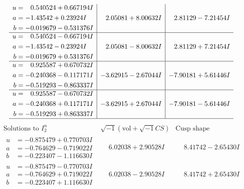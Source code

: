 \documentclass[1p]{elsarticle_modified}
\theoremstyle{definition}
\newcommand{\I}{\sqrt{-1}}
\begin{document}
$$\begin{array}{c|c|c}
\begin{aligned}
u &= \phantom{-}0.540524 + 0.667194 I \\
a &= -1.43542 + 0.23924 I \\
b &= -0.019679 - 0.531376 I\end{aligned}
 & \phantom{-}2.05081 + 8.00632 I & \phantom{-}2.81129 - 7.21454 I \\ \hline\begin{aligned}
u &= \phantom{-}0.540524 - 0.667194 I \\
a &= -1.43542 - 0.23924 I \\
b &= -0.019679 + 0.531376 I\end{aligned}
 & \phantom{-}2.05081 - 8.00632 I & \phantom{-}2.81129 + 7.21454 I \\ \hline\begin{aligned}
u &= \phantom{-}0.925587 + 0.670732 I \\
a &= -0.240368 - 0.117171 I \\
b &= -0.519293 - 0.863337 I\end{aligned}
 & -3.62915 - 2.67044 I & -7.90181 + 5.61446 I \\ \hline\begin{aligned}
u &= \phantom{-}0.925587 - 0.670732 I \\
a &= -0.240368 + 0.117171 I \\
b &= -0.519293 + 0.863337 I\end{aligned}
 & -3.62915 + 2.67044 I & -7.90181 - 5.61446 I\\
 \hline 
 \end{array}$$\newpage$$\begin{array}{c|c|c}  
\text{Solutions to }I^u_{2}& \I (\text{vol} + \sqrt{-1}CS) & \text{Cusp shape}\\
 \hline 
\begin{aligned}
u &= -0.875479 + 0.770703 I \\
a &= -0.764629 - 0.719022 I \\
b &= -0.223407 - 1.116630 I\end{aligned}
 & \phantom{-}6.02038 + 2.90528 I & \phantom{-}8.41742 - 2.65430 I \\ \hline\begin{aligned}
u &= -0.875479 - 0.770703 I \\
a &= -0.764629 + 0.719022 I \\
b &= -0.223407 + 1.116630 I\end{aligned}
 & \phantom{-}6.02038 - 2.90528 I & \phantom{-}8.41742 + 2.65430 I \\ \hline\begin{aligned}

\end{aligned}
\end{array}$$
\end{document}
